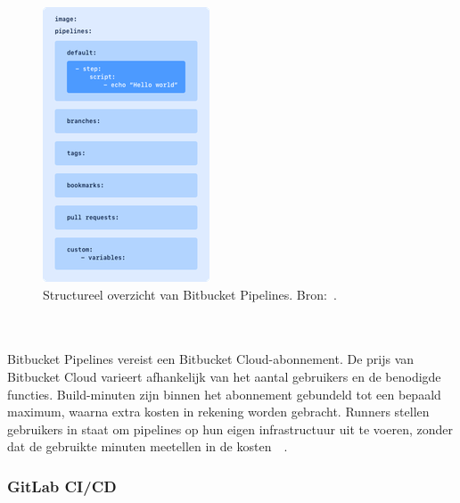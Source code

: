 \begin{figure}{\textwidth}
    \centering
    \includegraphics[width=0.3\linewidth]{Foto's/yml-structure.png}
    \caption{Structureel overzicht van Bitbucket Pipelines. Bron:~\autocite{atlassianConfigure}.}
    \label{fig:Structureel-overzicht}
\end{figure}
\\\\
Bitbucket Pipelines vereist een Bitbucket Cloud-abonnement. De prijs van Bitbucket Cloud varieert afhankelijk van het aantal gebruikers en de benodigde functies. Build-minuten zijn binnen het abonnement gebundeld tot een bepaald maximum, waarna extra kosten in rekening worden gebracht. Runners stellen gebruikers in staat om pipelines op hun eigen infrastructuur uit te voeren, zonder dat de gebruikte minuten meetellen in de kosten~\autocite{atlassianBambooSpecs}~\autocite{atlassianPricing}.

\newpage
\subsubsection{GitLab CI/CD}

